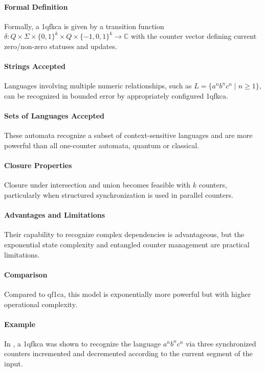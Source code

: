 \paragraph{Formal Definition}
Formally, a \gls{1qfkca} is given by a transition function $\delta: Q \times \Sigma \times \{0,1\}^k \times Q \times \{-1,0,1\}^k \rightarrow \mathbb{C}$ with the counter vector defining current zero/non-zero statuses and updates.

\paragraph{Strings Accepted}
Languages involving multiple numeric relationships, such as $L = \{ a^n b^n c^n \mid n \geq 1 \}$, can be recognized in bounded error by appropriately configured \gls{1qfkca}.

\paragraph{Sets of Languages Accepted}
These automata recognize a subset of context-sensitive languages and are more powerful than all one-counter automata, quantum or classical.

\paragraph{Closure Properties}
Closure under intersection and union becomes feasible with $k$ counters, particularly when structured synchronization is used in parallel counters.

\paragraph{Advantages and Limitations}
Their capability to recognize complex dependencies is advantageous, but the exponential state complexity and entangled counter management are practical limitations.

\paragraph{Comparison}
Compared to \gls{qf1ca}, this model is exponentially more powerful but with higher operational complexity.

\paragraph{Example}
In \cite{cem2012quantum}, a \gls{1qfkca} was shown to recognize the language $a^n b^n c^n$ via three synchronized counters incremented and decremented according to the current segment of the input.

